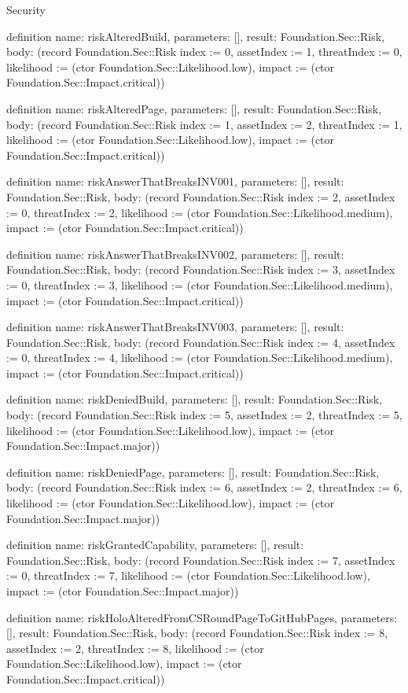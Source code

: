 \begin{lexlean}{Security}
\begin{semanticmodule}
definition{
  name: riskAlteredBuild,
  parameters: [],
  result: Foundation.Sec::Risk,
  body: (record Foundation.Sec::Risk {index := 0, assetIndex := 1, threatIndex := 0, likelihood := (ctor Foundation.Sec::Likelihood.low), impact := (ctor Foundation.Sec::Impact.critical)})
}

definition{
  name: riskAlteredPage,
  parameters: [],
  result: Foundation.Sec::Risk,
  body: (record Foundation.Sec::Risk {index := 1, assetIndex := 2, threatIndex := 1, likelihood := (ctor Foundation.Sec::Likelihood.low), impact := (ctor Foundation.Sec::Impact.critical)})
}

definition{
  name: riskAnswerThatBreaksINV001,
  parameters: [],
  result: Foundation.Sec::Risk,
  body: (record Foundation.Sec::Risk {index := 2, assetIndex := 0, threatIndex := 2, likelihood := (ctor Foundation.Sec::Likelihood.medium), impact := (ctor Foundation.Sec::Impact.critical)})
}

definition{
  name: riskAnswerThatBreaksINV002,
  parameters: [],
  result: Foundation.Sec::Risk,
  body: (record Foundation.Sec::Risk {index := 3, assetIndex := 0, threatIndex := 3, likelihood := (ctor Foundation.Sec::Likelihood.medium), impact := (ctor Foundation.Sec::Impact.critical)})
}

definition{
  name: riskAnswerThatBreaksINV003,
  parameters: [],
  result: Foundation.Sec::Risk,
  body: (record Foundation.Sec::Risk {index := 4, assetIndex := 0, threatIndex := 4, likelihood := (ctor Foundation.Sec::Likelihood.medium), impact := (ctor Foundation.Sec::Impact.critical)})
}

definition{
  name: riskDeniedBuild,
  parameters: [],
  result: Foundation.Sec::Risk,
  body: (record Foundation.Sec::Risk {index := 5, assetIndex := 2, threatIndex := 5, likelihood := (ctor Foundation.Sec::Likelihood.low), impact := (ctor Foundation.Sec::Impact.major)})
}

definition{
  name: riskDeniedPage,
  parameters: [],
  result: Foundation.Sec::Risk,
  body: (record Foundation.Sec::Risk {index := 6, assetIndex := 2, threatIndex := 6, likelihood := (ctor Foundation.Sec::Likelihood.low), impact := (ctor Foundation.Sec::Impact.major)})
}

definition{
  name: riskGrantedCapability,
  parameters: [],
  result: Foundation.Sec::Risk,
  body: (record Foundation.Sec::Risk {index := 7, assetIndex := 0, threatIndex := 7, likelihood := (ctor Foundation.Sec::Likelihood.low), impact := (ctor Foundation.Sec::Impact.major)})
}

definition{
  name: riskHoloAlteredFromCSRoundPageToGitHubPages,
  parameters: [],
  result: Foundation.Sec::Risk,
  body: (record Foundation.Sec::Risk {index := 8, assetIndex := 2, threatIndex := 8, likelihood := (ctor Foundation.Sec::Likelihood.low), impact := (ctor Foundation.Sec::Impact.critical)})
}


\end{semanticmodule}
\end{lexlean}
